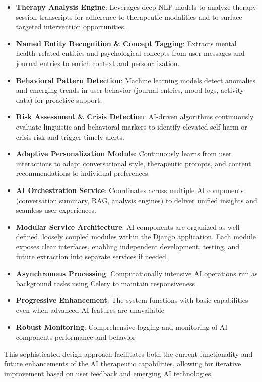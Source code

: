 \begin{itemize}
  \item \textbf{Therapy Analysis Engine}: Leverages deep NLP models to analyze therapy session transcripts for adherence to therapeutic modalities and to surface targeted intervention opportunities.
  \item \textbf{Named Entity Recognition & Concept Tagging}: Extracts mental health–related entities and psychological concepts from user messages and journal entries to enrich context and personalization.
  \item \textbf{Behavioral Pattern Detection}: Machine learning models detect anomalies and emerging trends in user behavior (journal entries, mood logs, activity data) for proactive support.
  \item \textbf{Risk Assessment & Crisis Detection}: AI-driven algorithms continuously evaluate linguistic and behavioral markers to identify elevated self-harm or crisis risk and trigger timely alerts.
  \item \textbf{Adaptive Personalization Module}: Continuously learns from user interactions to adapt conversational style, therapeutic prompts, and content recommendations to individual preferences.
  \item \textbf{AI Orchestration Service}: Coordinates across multiple AI components (conversation summary, RAG, analysis engines) to deliver unified insights and seamless user experiences.
    
  \item \textbf{Modular Service Architecture}: AI components are organized as well-defined, loosely coupled modules within the Django application. Each module exposes clear interfaces, enabling independent development, testing, and future extraction into separate services if needed.
    
  \item \textbf{Asynchronous Processing}: Computationally intensive AI operations run as background tasks using Celery to maintain responsiveness
  \item \textbf{Progressive Enhancement}: The system functions with basic capabilities even when advanced AI features are unavailable
  \item \textbf{Robust Monitoring}: Comprehensive logging and monitoring of AI components performance and behavior
\end{itemize}

This sophisticated design approach facilitates both the current functionality and future enhancements of the AI therapeutic capabilities, allowing for iterative improvement based on user feedback and emerging AI technologies.


